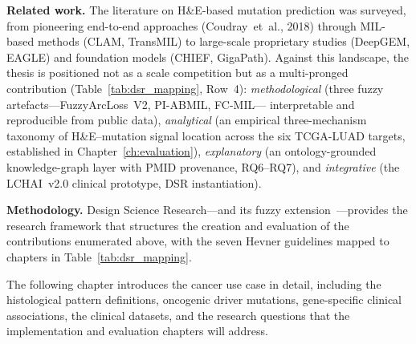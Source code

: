 \textbf{Related work.}
The literature on H\&E-based mutation prediction was surveyed, from pioneering end-to-end approaches (Coudray~et~al., 2018) through MIL-based methods (CLAM, TransMIL) to large-scale proprietary studies (DeepGEM, EAGLE) and foundation models (CHIEF, GigaPath).
Against this landscape, the thesis is positioned not as a scale
competition but as a multi-pronged contribution
(Table~\ref{tab:dsr_mapping}, Row~4): \emph{methodological}
(three fuzzy artefacts---FuzzyArcLoss~V2, PI-ABMIL, FC-MIL---%
interpretable and reproducible from public data),
\emph{analytical} (an empirical three-mechanism taxonomy of
H\&E--mutation signal location across the six TCGA-LUAD targets,
established in Chapter~\ref{ch:evaluation}), \emph{explanatory}
(an ontology-grounded knowledge-graph layer with PMID provenance,
RQ6--RQ7), and \emph{integrative} (the LCHAI~v2.0 clinical
prototype, DSR instantiation).

\textbf{Methodology.}
Design Science Research---and its fuzzy extension~\cite{meier2009fuzzy}---provides the research framework that structures the creation and evaluation of the contributions enumerated above, with the seven Hevner guidelines mapped to chapters in Table~\ref{tab:dsr_mapping}.

The following chapter introduces the cancer use case in detail, including the histological pattern definitions, oncogenic driver mutations, gene-specific clinical associations, the clinical datasets, and the research questions that the implementation and evaluation chapters will address.
